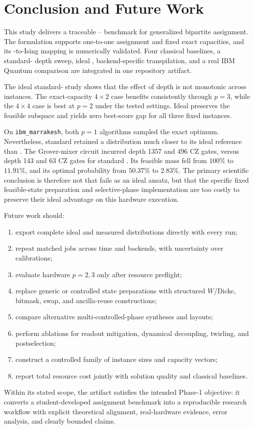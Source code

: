 \section{Conclusion and Future Work}

This study delivers a traceable \QUBO--\QAOA{} benchmark for generalized bipartite assignment. The formulation supports one-to-one assignment and fixed exact capacities, and its \QUBO-to-Ising mapping is numerically validated. Four classical baselines, a standard-\QAOA{} depth sweep, ideal \GMQAOA{}, backend-specific transpilation, and a real IBM Quantum comparison are integrated in one repository artifact.

The ideal standard-\QAOA{} study shows that the effect of depth is not monotonic across instances. The exact-capacity $4\times2$ case benefits consistently through $p=3$, while the $4\times4$ case is best at $p=2$ under the tested settings. Ideal \GMQAOA{} preserves the feasible subspace and yields zero best-score gap for all three fixed instances.

On \texttt{ibm\_marrakesh}, both $p=1$ algorithms sampled the exact optimum. Nevertheless, standard \QAOA{} retained a distribution much closer to its ideal reference than \GMQAOA{}. The Grover-mixer circuit incurred depth 1357 and 496 CZ gates, versus depth 143 and 63 CZ gates for standard \QAOA{}. Its feasible mass fell from $100\%$ to $11.91\%$, and its optimal probability from $50.37\%$ to $2.83\%$. The primary scientific conclusion is therefore not that \GMQAOA{} fails as an ideal ansatz, but that the specific fixed feasible-state preparation and selective-phase implementation are too costly to preserve their ideal advantage on this hardware execution.

Future work should:
\begin{enumerate}
  \item export complete ideal and measured distributions directly with every run;
  \item repeat matched jobs across time and backends, with uncertainty over calibrations;
  \item evaluate hardware $p=2,3$ only after resource preflight;
  \item replace generic or controlled state preparations with structured $W$/Dicke, bitmask, swap, and ancilla-reuse constructions;
  \item compare alternative multi-controlled-phase syntheses and layouts;
  \item perform ablations for readout mitigation, dynamical decoupling, twirling, and postselection;
  \item construct a controlled family of instance sizes and capacity vectors;
  \item report total resource cost jointly with solution quality and classical baselines.
\end{enumerate}

Within its stated scope, the artifact satisfies the intended Phase-1 objective: it converts a student-developed assignment benchmark into a reproducible research workflow with explicit theoretical alignment, real-hardware evidence, error analysis, and clearly bounded claims.
